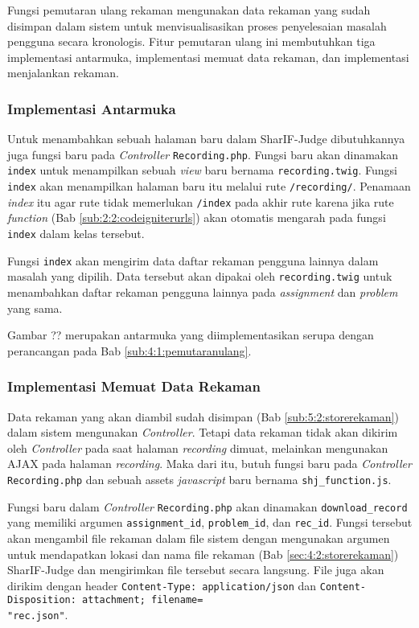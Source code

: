 Fungsi pemutaran ulang rekaman mengunakan data rekaman yang sudah disimpan dalam sistem untuk menvisualisasikan proses penyelesaian masalah pengguna secara kronologis. Fitur pemutaran ulang ini membutuhkan tiga implementasi antarmuka, implementasi memuat data rekaman, dan implementasi menjalankan rekaman. 

\subsubsection{Implementasi Antarmuka}

Untuk menambahkan sebuah halaman baru dalam SharIF-Judge dibutuhkannya juga fungsi baru pada \textit{Controller} \verb|Recording.php|. Fungsi baru akan dinamakan \verb|index| untuk menampilkan sebuah \textit{view} baru bernama \verb|recording.twig|. Fungsi \verb|index| akan menampilkan halaman baru itu melalui rute \verb|/recording/|. Penamaan \textit{index} itu agar rute tidak memerlukan \verb|/index| pada akhir rute karena jika rute \textit{function} (Bab \ref{sub:2:2:codeigniterurls}) akan otomatis mengarah pada fungsi \verb|index| dalam kelas tersebut.

Fungsi \verb|index| akan mengirim data daftar rekaman pengguna lainnya dalam masalah yang dipilih. Data tersebut akan dipakai oleh \verb|recording.twig| untuk menambahkan daftar rekaman pengguna lainnya pada \textit{assignment} dan \textit{problem} yang sama.

Gambar ?? merupakan antarmuka yang diimplementasikan serupa dengan perancangan pada Bab \ref{sub:4:1:pemutaranulang}.


\subsubsection{Implementasi Memuat Data Rekaman}
\label{ssub:5:2:4:memuatdata}

Data rekaman yang akan diambil sudah disimpan (Bab \ref{sub:5:2:storerekaman}) dalam sistem mengunakan \textit{Controller}. Tetapi data rekaman tidak akan dikirim oleh \textit{Controller} pada saat halaman \textit{recording} dimuat, melainkan mengunakan AJAX pada halaman \textit{recording}. Maka dari itu, butuh fungsi baru pada \textit{Controller} \verb|Recording.php| dan sebuah assets \textit{javascript} baru bernama \verb|shj_function.js|.

Fungsi baru dalam \textit{Controller} \verb|Recording.php| akan dinamakan \verb|download_record| yang memiliki argumen \verb|assignment_id|, \verb|problem_id|, dan \verb|rec_id|. Fungsi tersebut akan mengambil file rekaman dalam file sistem dengan mengunakan argumen untuk mendapatkan lokasi dan nama file rekaman (Bab \ref{sec:4:2:storerekaman}) SharIF-Judge dan mengirimkan file tersebut secara langsung. File juga akan dirikim dengan header \verb|Content-Type: application/json| dan \verb|Content-Disposition: attachment; filename=|\\\verb|"rec.json"|.

